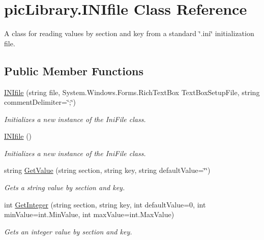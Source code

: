 \hypertarget{classpic_library_1_1_i_n_ifile}{}\section{pic\+Library.\+I\+N\+Ifile Class Reference}
\label{classpic_library_1_1_i_n_ifile}


A class for reading values by section and key from a standard \char`\"{}.\+ini\char`\"{} initialization file.  


\subsection*{Public Member Functions}
\begin{DoxyCompactItemize}
\item 
\mbox{\hyperlink{classpic_library_1_1_i_n_ifile_a6ac876cf9139c7962dff6454d4f849ec}{I\+N\+Ifile}} (string file, System.\+Windows.\+Forms.\+Rich\+Text\+Box Text\+Box\+Setup\+File, string comment\+Delimiter=\char`\"{};\char`\"{})
\begin{DoxyCompactList}\small\item\em Initializes a new instance of the Ini\+File class. \end{DoxyCompactList}\item 
\mbox{\hyperlink{classpic_library_1_1_i_n_ifile_ae837a0427f22852092de502c0871b711}{I\+N\+Ifile}} ()
\begin{DoxyCompactList}\small\item\em Initializes a new instance of the Ini\+File class. \end{DoxyCompactList}\item 
string \mbox{\hyperlink{classpic_library_1_1_i_n_ifile_a3af503f215c3c270458847c7f6733da5}{Get\+Value}} (string section, string key, string default\+Value=\char`\"{}\char`\"{})
\begin{DoxyCompactList}\small\item\em Gets a string value by section and key. \end{DoxyCompactList}\item 
int \mbox{\hyperlink{classpic_library_1_1_i_n_ifile_a42c91c015717857efebbe40bf3a8f8d8}{Get\+Integer}} (string section, string key, int default\+Value=0, int min\+Value=int.\+Min\+Value, int max\+Value=int.\+Max\+Value)
\begin{DoxyCompactList}\small\item\em Gets an integer value by section and key. \end{DoxyCompactList}\item 

\end{DoxyCompactItemize}
